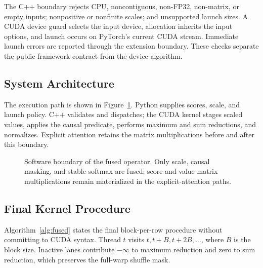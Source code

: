 \documentclass[twoside,twocolumn,10pt]{article}
\newcounter{algorithm}
\begin{document}
The C++ boundary rejects CPU, noncontiguous, non-FP32, non-matrix, or empty
inputs; nonpositive or nonfinite scales; and unsupported launch sizes. A CUDA
device guard selects the input device, allocation inherits the input options,
and launch occurs on PyTorch's current CUDA stream. Immediate launch errors are
reported through the extension boundary. These checks separate the public
framework contract from the device algorithm.

\subsection{System Architecture}

The execution path is shown in Figure~\ref{fig:architecture}. Python supplies
scores, scale, and launch policy. C++ validates and dispatches; the CUDA kernel
stages scaled values, applies the causal predicate, performs maximum and sum
reductions, and normalizes. Explicit attention retains the matrix
multiplications before and after this boundary.

\begin{figure}[t]
\centering
\setlength{\fboxsep}{6pt}
\caption{Software boundary of the fused operator. Only scale, causal masking,
and stable softmax are fused; score and value matrix multiplications remain
materialized in the explicit-attention paths.}
\label{fig:architecture}
\end{figure}

\subsection{Final Kernel Procedure}

Algorithm~\ref{alg:fused} states the final block-per-row procedure without
committing to CUDA syntax. Thread $t$ visits $t,t+B,t+2B,\ldots$, where $B$ is
the block size. Inactive lanes contribute $-\infty$ to maximum reduction and
zero to sum reduction, which preserves the full-warp shuffle mask.
\end{document}
